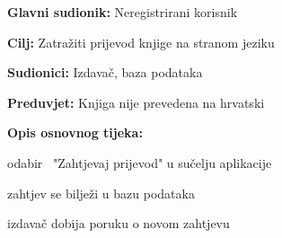 					\noindent {}
					\begin{packed_item}
						\item \textbf{Glavni sudionik: }Neregistrirani korisnik
						\item  \textbf{Cilj:} Zatražiti prijevod knjige na stranom jeziku
						\item  \textbf{Sudionici:} Izdavač, baza podataka
						\item  \textbf{Preduvjet:} Knjiga nije prevedena na hrvatski
						\item  \textbf{Opis osnovnog tijeka:}
						\item[] \begin{packed_enum}
							\item odabir ~"Zahtjevaj prijevod" u sučelju aplikacije
							\item zahtjev se bilježi u bazu podataka
							\item izdavač dobija poruku o novom zahtjevu
						\end{packed_enum}
					\end{packed_item}
					
